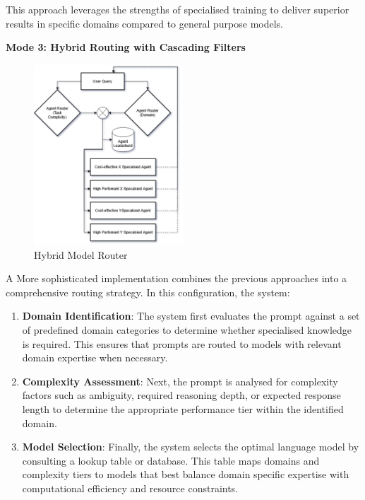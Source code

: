 This approach leverages the strengths of specialised training to deliver superior results in specific domains compared to general purpose models.

\newpage

\textbf{Mode 3: Hybrid Routing with Cascading Filters}

\begin{figure}[H]
    \centering
    \includegraphics[width=0.5\textwidth]{figures/hybrid-agent-router.drawio.png}
    \caption{Hybrid Model Router}
    \label{fig:hybrid_model_router}
\end{figure}

A More sophisticated implementation combines the previous approaches into a comprehensive routing strategy. In this configuration, the system:

\begin{enumerate}
    \item \textbf{Domain Identification}: The system first evaluates the prompt against a set of predefined domain categories to determine whether specialised knowledge is required. This ensures that prompts are routed to models with relevant domain expertise when necessary.
    \item \textbf{Complexity Assessment}: Next, the prompt is analysed for complexity factors such as ambiguity, required reasoning depth, or expected response length to determine the appropriate performance tier within the identified domain.
    \item \textbf{Model Selection}: Finally, the system selects the optimal language model by consulting a lookup table or database. This table maps domains and complexity tiers to models that best balance domain specific expertise with computational efficiency and resource constraints.
\end{enumerate}

